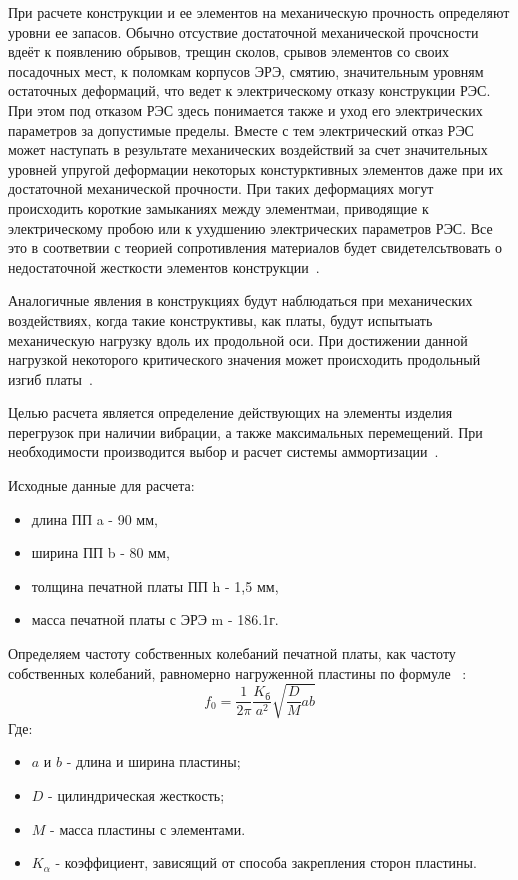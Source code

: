 При расчете конструкции и ее элементов на механическую прочность
определяют уровни ее запасов.  Обычно отсуствие достаточной
механической прочсности вдеёт к появлению обрывов, трещин сколов,
срывов элементов со своих посадочных мест, к поломкам корпусов ЭРЭ,
смятию, значительным уровням остаточных деформаций, что ведет к
электрическому отказу конструкции РЭС.
При этом под отказом РЭС здесь понимается также и уход его
электрических параметров за допустимые пределы. Вместе с тем
электрический отказ РЭС может наступать в результате механических
воздействий за счет значительных уровней упругой деформации некоторых
констурктивных элементов даже при их достаточной механической
прочности. При таких деформациях могут происходить короткие замыканиях
между элементмаи, приводящие к электрическому пробою или к ухудшению
электрических параметров РЭС. Все это в соответвии с теорией
сопротивления материалов будет свидетелсьтвовать о недостаточной
жесткости элементов конструкции~\cite{Kalenkovich1989}.

Аналогичные явления в конструкциях будут наблюдаться при механических
воздействиях, когда такие конструктивы, как платы, будут испытыать
механическую нагрузку вдоль их продольной оси.
При достижении данной нагрузкой некоторого критического значения может
происходить продольный изгиб платы~\cite{Kalenkovich1989}.

Целью расчета является определение действующих на элементы изделия
перегрузок при наличии вибрации, а также максимальных перемещений.
При необходимости производится выбор и расчет системы
аммортизации~\cite{Kalenkovich2012}.

Исходные данные для расчета:
\begin{itemize}
\item длина ПП a - 90 мм,
  
\item ширина ПП b - 80 мм,
  
\item толщина печатной платы ПП h - 1,5 мм,
  
\item масса печатной платы с ЭРЭ m - 186.1г.
\end{itemize}

Определяем частоту собственных колебаний печатной платы, как
частоту собственных колебаний, равномерно нагруженной пластины по
формуле ~\cite{Kalenkovich2012}:
\begin{equation}
  f_0 = \frac{1}{2\pi}\frac{K_{\text{б}}}{a^2}\sqrt{\frac{D}{M}ab}
\end{equation}
Где:
\begin{itemize}
\item $a$ и $b$ - длина и ширина пластины;

\item $D$ - цилиндрическая жесткость;
\item $M$ - масса пластины с элементами.
\item $K_{\alpha}$ - коэффициент, зависящий от способа закрепления сторон пластины.
\end{itemize}

